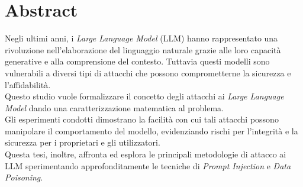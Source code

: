 \section*{Abstract}
Negli ultimi anni, i \emph{Large Language Model} (LLM) hanno rappresentato una rivoluzione nell'elaborazione del linguaggio naturale grazie alle loro capacit\`a generative e alla comprensione del contesto. Tuttavia questi modelli sono vulnerabili a diversi tipi di attacchi che possono comprometterne la sicurezza e l'affidabilit\`a.\\
Questo studio vuole formalizzare il concetto degli attacchi ai \emph{Large Language Model} dando una caratterizzazione matematica al problema.\\
Gli esperimenti condotti dimostrano la facilit\`a con cui tali attacchi possono manipolare il comportamento del modello, evidenziando rischi per l'integrit\`a e la sicurezza per i proprietari e gli utilizzatori.\\
Questa tesi, inoltre, affronta ed esplora le principali metodologie di attacco ai LLM sperimentando approfonditamente le tecniche di \emph{Prompt Injection} e \emph{Data Poisoning}.